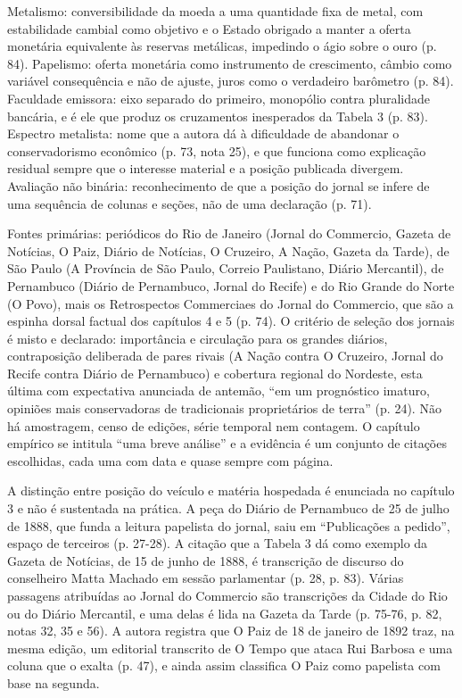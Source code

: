 Metalismo: conversibilidade da moeda a uma quantidade fixa de metal, com
estabilidade cambial como objetivo e o Estado obrigado a manter a oferta
monetária equivalente às reservas metálicas, impedindo o ágio sobre o ouro
(p. 84). Papelismo: oferta monetária como instrumento de crescimento, câmbio
como variável consequência e não de ajuste, juros como o verdadeiro barômetro
(p. 84). Faculdade emissora: eixo separado do primeiro, monopólio contra
pluralidade bancária, e é ele que produz os cruzamentos inesperados da Tabela
3 (p. 83). Espectro metalista: nome que a autora dá à dificuldade de abandonar
o conservadorismo econômico (p. 73, nota 25), e que funciona como explicação
residual sempre que o interesse material e a posição publicada divergem.
Avaliação não binária: reconhecimento de que a posição do jornal se infere de
uma sequência de colunas e seções, não de uma declaração (p. 71).

Fontes primárias: periódicos do Rio de Janeiro (Jornal do Commercio, Gazeta de
Notícias, O Paiz, Diário de Notícias, O Cruzeiro, A Nação, Gazeta da Tarde),
de São Paulo (A Província de São Paulo, Correio Paulistano, Diário Mercantil),
de Pernambuco (Diário de Pernambuco, Jornal do Recife) e do Rio Grande do
Norte (O Povo), mais os Retrospectos Commerciaes do Jornal do Commercio, que
são a espinha dorsal factual dos capítulos 4 e 5 (p. 74). O critério de
seleção dos jornais é misto e declarado: importância e circulação para os
grandes diários, contraposição deliberada de pares rivais (A Nação contra O
Cruzeiro, Jornal do Recife contra Diário de Pernambuco) e cobertura regional
do Nordeste, esta última com expectativa anunciada de antemão, ``em um
prognóstico imaturo, opiniões mais conservadoras de tradicionais proprietários
de terra'' (p. 24). Não há amostragem, censo de edições, série temporal nem
contagem. O capítulo empírico se intitula ``uma breve análise'' e a evidência
é um conjunto de citações escolhidas, cada uma com data e quase sempre com
página.

A distinção entre posição do veículo e matéria hospedada é enunciada no
capítulo 3 e não é sustentada na prática. A peça do Diário de Pernambuco de 25
de julho de 1888, que funda a leitura papelista do jornal, saiu em
``Publicações a pedido'', espaço de terceiros (p. 27-28). A citação que a
Tabela 3 dá como exemplo da Gazeta de Notícias, de 15 de junho de 1888, é
transcrição de discurso do conselheiro Matta Machado em sessão parlamentar
(p. 28, p. 83). Várias passagens atribuídas ao Jornal do Commercio são
transcrições da Cidade do Rio ou do Diário Mercantil, e uma delas é lida na
Gazeta da Tarde (p. 75-76, p. 82, notas 32, 35 e 56). A autora registra que O
Paiz de 18 de janeiro de 1892 traz, na mesma edição, um editorial transcrito
de O Tempo que ataca Rui Barbosa e uma coluna que o exalta (p. 47), e ainda
assim classifica O Paiz como papelista com base na segunda.


